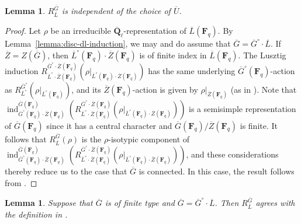\documentclass[reqno]{amsart}
\numberwithin{equation}{subsection}
\newcommand{\F}{\mathbf{F}}
\newcommand{\Q}{\mathbf{Q}}
\newcommand{\ol}[1]{\overline{#1}}
\DeclareMathOperator{\ind}{ind}
\newtheorem{lemma}[thm]{Lemma}
\theoremstyle{remark}
\numberwithin{equation}{subsection}
\numberwithin{figure}{subsection}
\begin{document}
\begin{lemma}\label{lemma:independence-of-parabolic}
    $R_{\ol L}^{\ol G}$ is independent of the choice of $\ol U$.
\end{lemma}

\begin{proof}
    Let $\rho$ be an irreducible $\ol\Q_\ell$-representation of $\ol L(\F_q)$. By Lemma~\ref{lemma:disc-dl-induction}, we may and do assume that $\ol G = \ol G^\circ \cdot \ol L$. If $\ol Z = Z(\ol G)$, then $\ol L^\circ(\F_q) \cdot \ol Z(\F_q)$ is of finite index in $\ol L(\F_q)$. The Lusztig induction $R_{\ol L^\circ \cdot \ol Z(\F_q)}^{\ol G^\circ \cdot \ol Z(\F_q)}(\rho|_{\ol L^\circ(\F_q) \cdot \ol Z(\F_q)})$ has the same underlying $\ol G^\circ(\F_q)$-action as $R_{\ol L^\circ}^{\ol G^\circ}(\rho|_{\ol L^\circ(\F_q)})$, and its $\ol Z(\F_q)$-action is given by $\rho|_{\ol Z(\F_q)}$ (as in \cite[Remark 2.6.5]{Kal21b}). Note that $\ind_{\ol G^\circ(\F_q) \cdot \ol Z(\F_q)}^{\ol G(\F_q)}(R_{\ol L^\circ \cdot \ol Z(\F_q)}^{\ol G^\circ \cdot \ol Z(\F_q)}(\rho|_{\ol L^\circ(\F_q) \cdot \ol Z(\F_q)}))$ is a semisimple representation of $\ol G(\F_q)$ since it has a central character and $\ol G(\F_q)/\ol Z(\F_q)$ is finite. It follows that $R_{\ol L}^{\ol G}(\rho)$ is the $\rho$-isotypic component of $\ind_{\ol G^\circ(\F_q) \cdot \ol Z(\F_q)}^{\ol G(\F_q)}(R_{\ol L^\circ \cdot \ol Z(\F_q)}^{\ol G^\circ \cdot \ol Z(\F_q)}(\rho|_{\ol L^\circ(\F_q) \cdot \ol Z(\F_q)}))$, and these considerations thereby reduce us to the case that $\ol G$ is connected.
    In this case, the result follows from \cite[Theorem~8.7.2]{GRV26}.
\end{proof}



\begin{lemma}\label{lemma:agreement-with-digne-michel}
    Suppose that $\ol G$ is of finite type and $\ol G = \ol G^\circ \cdot \ol L$. Then $R_{\ol L}^{\ol G}$ agrees with the definition in \cite[D\'efinition 2.2]{DM94}.
\end{lemma}
\end{document}
